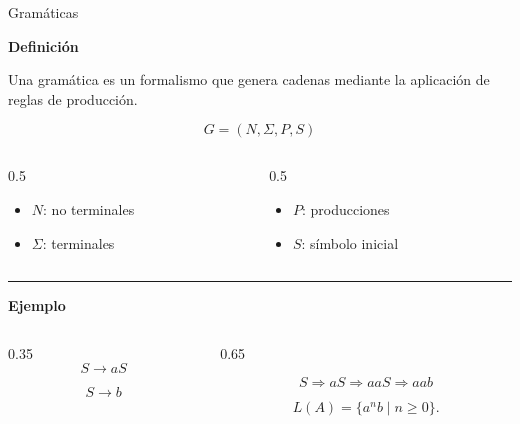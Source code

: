 \documentclass{beamer}
\begin{document}
\begin{frame}{Gramáticas}

    \textbf{Definición}

    Una gramática es un formalismo que genera cadenas mediante la aplicación de reglas de producción.

    \pause

    \[
        G=(N,\Sigma,P,S)
    \]

    \begin{columns}

        \begin{column}{0.5\textwidth}
            \begin{itemize}
                \item $N$: no terminales
                \item $\Sigma$: terminales
            \end{itemize}
        \end{column}

        \begin{column}{0.5\textwidth}
            \begin{itemize}
                \item $P$: producciones
                \item $S$: símbolo inicial
            \end{itemize}
        \end{column}

    \end{columns}

    \pause

    \vspace{0.3cm}
    \hrule
    \vspace{0.3cm}

    \textbf{Ejemplo}

    \begin{columns}

        \begin{column}{0.35\textwidth}
            \[
                S \rightarrow aS
            \]

            \[
                S \rightarrow b
            \]
        \end{column}

        \begin{column}{0.65\textwidth}

            \[
                S \Rightarrow aS \Rightarrow aaS \Rightarrow aab
            \]

            \pause

            \[
                L(A)=\{a^n b \mid n\geq 0\}.
            \]

        \end{column}

    \end{columns}

\end{frame}
\end{document}
